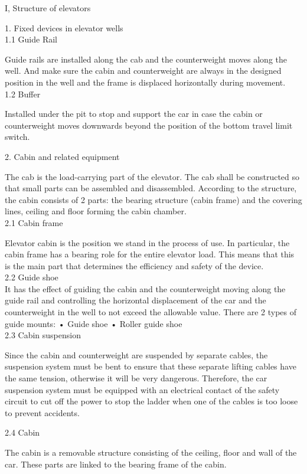 


I, Structure of elevators

1.  Fixed devices in elevator wells\\
1.1  Guide Rail

Guide rails are installed along the cab and the counterweight moves along the well. And make sure the cabin and counterweight are always in the designed position in the well and the frame is displaced horizontally during movement.\\
1.2  Buffer

Installed under the pit to stop and support the car in case the cabin or counterweight moves downwards beyond the position of the bottom travel limit switch.

2. Cabin and related equipment

The cab is the load-carrying part of the elevator. The cab shall be constructed so that small parts can be assembled and disassembled. According to the structure, the cabin consists of 2 parts: the bearing structure (cabin frame) and the covering lines, ceiling and floor forming the cabin chamber.\\

2.1 Cabin frame

Elevator cabin is the position we stand in the process of use. In particular, the cabin frame has a bearing role for the entire elevator load. This means that this is the main part that determines the efficiency and safety of the device.\\
2.2 Guide shoe\\

It has the effect of guiding the cabin and the counterweight moving along the guide rail and controlling the horizontal displacement of the car and the counterweight in the well to not exceed the allowable value. There are 2 types of guide mounts:
•	Guide shoe 
•	Roller guide shoe\\

2.3 Cabin suspension

Since the cabin and counterweight are suspended by separate cables, the suspension system must be bent to ensure that these separate lifting cables have the same tension, otherwise it will be very dangerous. Therefore, the car suspension system must be equipped with an electrical contact of the safety circuit to cut off the power to stop the ladder when one of the cables is too loose to prevent accidents.

2.4 Cabin

The cabin is a removable structure consisting of the ceiling, floor and wall of the car. These parts are linked to the bearing frame of the cabin.

